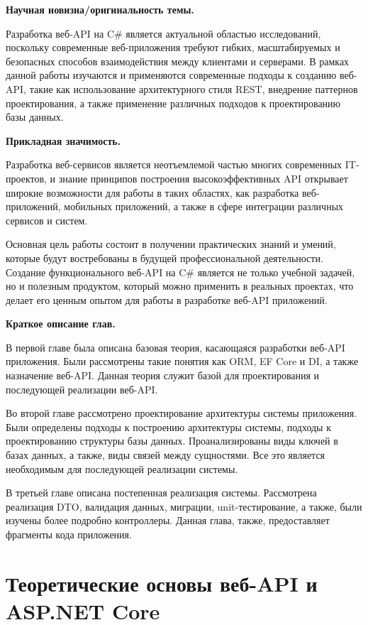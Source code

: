 \documentclass[a4paper,12pt]{report}
\begin{document}
\textbf{Научная новизна/оригинальность темы.}

Разработка веб-\acs{API} на C\# является актуальной областью исследований, поскольку современные веб-приложения требуют гибких, 
масштабируемых и безопасных способов взаимодействия между клиентами и серверами. В рамках данной работы изучаются
и применяются современные подходы к созданию веб-\acs{API}, такие как использование архитектурного стиля \acs{REST}, внедрение паттернов 
проектирования, а также применение различных подходов к проектированию базы данных.

\textbf{Прикладная значимость.}

Разработка веб-сервисов является неотъемлемой частью многих современных IT-проектов, и знание принципов построения высокоэффективных 
\acs{API} открывает широкие возможности для работы в таких областях, как разработка веб-приложений, мобильных приложений, 
а также в сфере интеграции различных сервисов и систем.

Основная цель работы состоит в получении практических знаний и умений, которые будут востребованы в будущей профессиональной деятельности. 
Создание функционального веб-\acs{API} на C\# является не только учебной задачей, но и полезным продуктом, который можно применить в реальных проектах, 
что делает его ценным опытом для работы в разработке веб-\acs{API} приложений.

\textbf{Краткое описание глав.}

В первой главе была описана базовая теория, касающаяся разработки веб-\acs{API} приложения. 
Были рассмотрены такие понятия как \acs{ORM}, \acs{EF} Core и \acs{DI}, а также назначение веб-\acs{API}. 
Данная теория служит базой для проектирования и последующей реализации веб-\acs{API}.

Во второй главе рассмотрено проектирование архитектуры системы приложения. 
Были определены подходы к построению архитектуры системы, подходы к проектированию структуры базы данных. 
Проанализированы виды ключей в базах данных, а также, виды связей между сущностями. 
Все это является необходимым для последующей реализации системы.

В третьей главе описана постепенная реализация системы. Рассмотрена реализация \acs{DTO}, валидация данных, 
миграции, unit-тестирование, а также, были изучены более подробно контроллеры. 
Данная глава, также, предоставляет фрагменты кода приложения.

\chapter{Теоретические основы веб-\acs{API} и ASP.NET Core}\label{intro_chapter_title}
\end{document}
